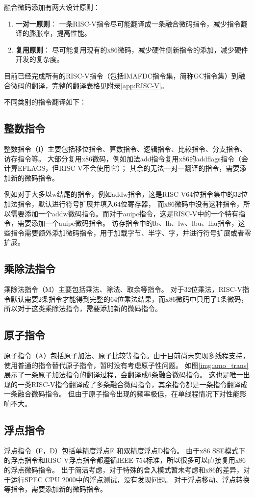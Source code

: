 融合微码添加有两大设计原则：
\begin{enumerate}
  \item \textbf{一对一原则}： 一条RISC-V指令尽可能翻译成一条融合微码指令，减少指令翻译的膨胀率，提高性能。
  \item \textbf{复用原则}： 尽可能复用现有的x86微码，减少硬件侧新指令的添加，减少硬件开发的复杂度。
\end{enumerate}

目前已经完成所有的RISC-V指令（包括IMAFDC指令集，简称GC指令集）到融合微码的翻译，完整的翻译表格见附录\ref{app:RISC-V}。

不同类别的指令翻译如下：

\subsection{整数指令}
整数指令（I）主要包括移位指令、算数指令、逻辑指令、比较指令、分支指令、访存指令等。
大部分复用x86微码，例如加法add指令复用x86的addflags指令（会计算EFLAGS，但RISC-V不会使用它）；
其余的无法一对一翻译的指令，需要添加新的微码指令。

例如对于大多以w结尾的指令，例如addw指令，这是RISC-V64位指令集中的32位加法指令，默认进行符号扩展并填入64位寄存器，
而x86微码中没有这种指令，所以需要添加一个addw微码指令。而对于auipc指令，这是RISC-V中的一个特有指令，需要添加一个auipc微码指令。
访存指令中的lb、lh、lw、lbu、lhu指令，这些指令需要额外添加微码指令，用于加载字节、半字、字，并进行符号扩展或者零扩展。


\subsection{乘除法指令}
乘除法指令（M）主要包括乘法、除法、取余等指令。
对于32位乘法，RISC-V指令默认需要2条指令才能得到完整的64位乘法结果，而x86微码中只用了1条微码，
所以对于这类乘除法指令，需要添加新的微码指令。

\subsection{原子指令}
原子指令（A）包括原子加法、原子比较等指令。由于目前尚未实现多线程支持，使用普通的指令替代原子指令，暂时没有考虑原子性问题。
如图\ref{img:amo_trans}展示了一条原子加法指令的翻译过程，会翻译成6条融合微码指令。
这也是唯一出现的一类RISC-V指令翻译成了多条融合微码指令，其余指令都是一条指令翻译成一条融合微码指令。
但由于原子指令出现的频率极低，在单线程情况下对性能影响不大。

\subsection{浮点指令}
浮点指令（F，D）包括单精度浮点F 和双精度浮点D指令。
由于x86 SSE模式下的浮点指令和RISC-V浮点指令都遵循IEEE-754标准，所以很多可以直接复用x86的浮点微码指令。
出于简洁考虑，对于特殊的舍入模式暂未考虑和x86的差异，对于运行SPEC CPU 2000中的浮点测试，没有发现问题。
对于浮点移动、浮点转换等指令，需要添加新的微码指令。

